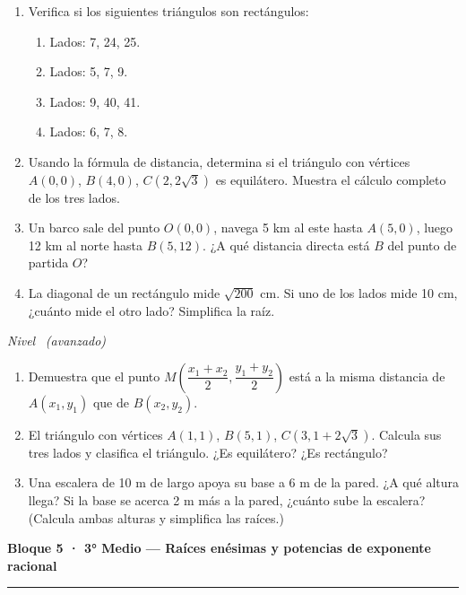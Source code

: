 \documentclass[11pt, letterpaper]{article}
\newcommand{\seccionheader}[2]{%
  \vspace{1.2em}
  \noindent
  {\Large\bfseries\color{#1} #2}\par
  \vspace{0.3em}
  {\noindent\color{#1}\rule{\linewidth}{0.8pt}}
  \vspace{0.8em}
}
\begin{document}
\begin{enumerate}[label=\textbf{\arabic*.}, leftmargin=*, resume]
  \item Verifica si los siguientes triángulos son rectángulos:
  \begin{enumerate}[label=\alph*)]
    \item Lados: 7, 24, 25.
    \item Lados: 5, 7, 9.
    \item Lados: 9, 40, 41.
    \item Lados: 6, 7, 8.
  \end{enumerate}

  \item Usando la fórmula de distancia, determina si el triángulo con vértices $A(0,0)$, $B(4,0)$, $C(2,2\sqrt{3})$ es equilátero. Muestra el cálculo completo de los tres lados.

  \item Un barco sale del punto $O(0,0)$, navega 5 km al este hasta $A(5,0)$, luego 12 km al norte hasta $B(5,12)$. ¿A qué distancia directa está $B$ del punto de partida $O$?

  \item La diagonal de un rectángulo mide $\sqrt{200}$ cm. Si uno de los lados mide 10 cm, ¿cuánto mide el otro lado? Simplifica la raíz.
\end{enumerate}

\textit{Nivel} \bigstar\bigstar\bigstar\ \textit{(avanzado)}

\begin{enumerate}[label=\textbf{\arabic*.}, leftmargin=*, resume]
  \item Demuestra que el punto $M\left(\dfrac{x_1+x_2}{2},\dfrac{y_1+y_2}{2}\right)$ está a la misma distancia de $A(x_1,y_1)$ que de $B(x_2,y_2)$.

  \item El triángulo con vértices $A(1,1)$, $B(5,1)$, $C(3,1+2\sqrt{3})$. Calcula sus tres lados y clasifica el triángulo. ¿Es equilátero? ¿Es rectángulo?

  \item Una escalera de 10 m de largo apoya su base a 6 m de la pared. ¿A qué altura llega? Si la base se acerca 2 m más a la pared, ¿cuánto sube la escalera? (Calcula ambas alturas y simplifica las raíces.)
\end{enumerate}

\clearpage
\seccionheader{blockc}{Bloque 5 · 3° Medio — Raíces enésimas y potencias de exponente racional}
\end{document}
